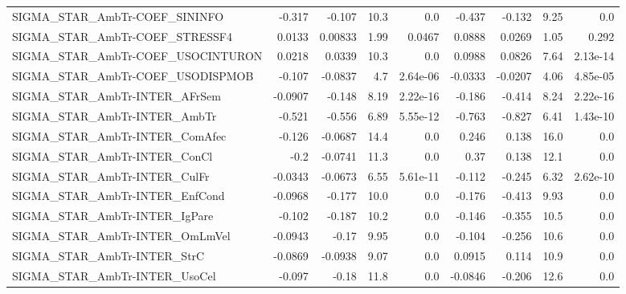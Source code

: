 \begin{tabular}{lrrrrrrrr}
SIGMA\_STAR\_AmbTr-COEF\_SININFO          &      -0.317 &       -0.107 &    10.3 &      0.0 &     -0.437 &      -0.132 &         9.25 &           0.0 \\
SIGMA\_STAR\_AmbTr-COEF\_STRESSF4         &      0.0133 &      0.00833 &    1.99 &   0.0467 &     0.0888 &      0.0269 &         1.05 &         0.292 \\
SIGMA\_STAR\_AmbTr-COEF\_USOCINTURON      &      0.0218 &       0.0339 &    10.3 &      0.0 &     0.0988 &      0.0826 &         7.64 &      2.13e-14 \\
SIGMA\_STAR\_AmbTr-COEF\_USODISPMOB       &      -0.107 &      -0.0837 &     4.7 & 2.64e-06 &    -0.0333 &     -0.0207 &         4.06 &      4.85e-05 \\
SIGMA\_STAR\_AmbTr-INTER\_AFrSem          &     -0.0907 &       -0.148 &    8.19 & 2.22e-16 &     -0.186 &      -0.414 &         8.24 &      2.22e-16 \\
SIGMA\_STAR\_AmbTr-INTER\_AmbTr           &      -0.521 &       -0.556 &    6.89 & 5.55e-12 &     -0.763 &      -0.827 &         6.41 &      1.43e-10 \\
SIGMA\_STAR\_AmbTr-INTER\_ComAfec         &      -0.126 &      -0.0687 &    14.4 &      0.0 &      0.246 &       0.138 &         16.0 &           0.0 \\
SIGMA\_STAR\_AmbTr-INTER\_ConCl           &        -0.2 &      -0.0741 &    11.3 &      0.0 &       0.37 &       0.138 &         12.1 &           0.0 \\
SIGMA\_STAR\_AmbTr-INTER\_CulFr           &     -0.0343 &      -0.0673 &    6.55 & 5.61e-11 &     -0.112 &      -0.245 &         6.32 &      2.62e-10 \\
SIGMA\_STAR\_AmbTr-INTER\_EnfCond         &     -0.0968 &       -0.177 &    10.0 &      0.0 &     -0.176 &      -0.413 &         9.93 &           0.0 \\
SIGMA\_STAR\_AmbTr-INTER\_IgPare          &      -0.102 &       -0.187 &    10.2 &      0.0 &     -0.146 &      -0.355 &         10.5 &           0.0 \\
SIGMA\_STAR\_AmbTr-INTER\_OmLmVel         &     -0.0943 &        -0.17 &    9.95 &      0.0 &     -0.104 &      -0.256 &         10.6 &           0.0 \\
SIGMA\_STAR\_AmbTr-INTER\_StrC            &     -0.0869 &      -0.0938 &    9.07 &      0.0 &     0.0915 &       0.114 &         10.9 &           0.0 \\
SIGMA\_STAR\_AmbTr-INTER\_UsoCel          &      -0.097 &        -0.18 &    11.8 &      0.0 &    -0.0846 &      -0.206 &         12.6 &           0.0 \\

\end{tabular}
